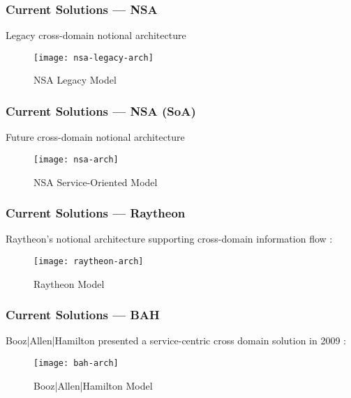 
\begin{frame}
\frametitle{Current Solutions --- NSA}
Legacy cross-domain notional architecture \cite{proposal:nsa-arch}
\begin{figure}[!t]
\centering
\texttt{[image: nsa-legacy-arch]}
\caption{NSA Legacy Model}
\label{fig:model:conceptual-model}
\end{figure}
\end{frame}

\begin{frame}
\frametitle{Current Solutions --- NSA (SoA)}
Future cross-domain notional architecture \cite{proposal:nsa-arch}
\begin{figure}[!t]
\centering
\texttt{[image: nsa-arch]}
\caption{NSA Service-Oriented Model}
\label{fig:model:conceptual-model}
\end{figure}
\end{frame}

\begin{frame}
\frametitle{Current Solutions --- Raytheon}
Raytheon's notional architecture supporting cross-domain information flow \cite{proposal:raytheon-arch}:
\begin{figure}[!t]
\centering
\texttt{[image: raytheon-arch]}
\caption{Raytheon Model}
\label{fig:model:conceptual-model}
\end{figure}
\end{frame}

\begin{frame}
\frametitle{Current Solutions --- BAH}
Booz|Allen|Hamilton presented a service-centric cross domain solution in 2009 \cite{proposal:bah-arch}:
\begin{figure}[!t]
\centering
\texttt{[image: bah-arch]}
\caption{Booz|Allen|Hamilton Model}
\label{fig:model:conceptual-model}
\end{figure}
\end{frame}

